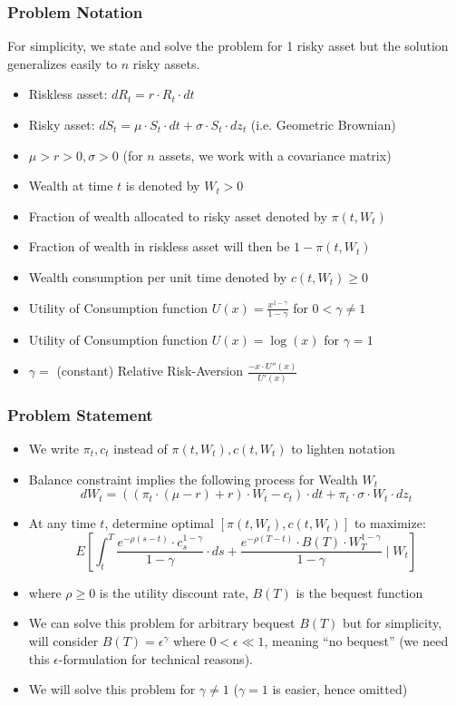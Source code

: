 \documentclass[handout]{beamer}
\begin{document}
\begin{frame}
\frametitle{Problem Notation}
For simplicity, we state and solve the problem for 1 risky asset but the solution generalizes easily to $n$ risky assets.
\pause
\begin{itemize}[<+->]
\item Riskless asset: $dR_t = r \cdot R_t \cdot dt$
\item Risky asset: $dS_t = \mu \cdot S_t \cdot dt + \sigma \cdot S_t \cdot dz_t$ (i.e. Geometric Brownian)
\item $\mu > r > 0, \sigma > 0$ (for $n$ assets, we work with a covariance matrix)
\item Wealth at time $t$ is denoted by $W_t > 0$
\item Fraction of wealth allocated to risky asset denoted by $\pi(t, W_t)$
\item Fraction of wealth in riskless asset will then be $1 - \pi(t, W_t)$
\item Wealth consumption per unit time denoted by $c(t, W_t) \geq 0$
\item Utility of Consumption function $U(x) = \frac {x^{1-\gamma}} {1 - \gamma}$ for $0 < \gamma \neq 1$
\item Utility of Consumption function $U(x) = \log(x)$ for $\gamma = 1$
\item $\gamma =$ (constant) Relative Risk-Aversion $\frac {-x \cdot U''(x)} {U'(x)}$
\end{itemize}
\end{frame}

\begin{frame}
\frametitle{Problem Statement}
\pause
\begin{itemize}[<+->]
\item We write $\pi_t, c_t$ instead of $\pi(t, W_t), c(t, W_t)$ to lighten notation
\item Balance constraint implies the following process for Wealth $W_t$
$$dW_t = ((\pi_t \cdot (\mu - r) + r) \cdot W_t - c_t) \cdot dt + \pi_t \cdot \sigma \cdot W_t \cdot dz_t$$
\item At any time $t$, determine optimal $[\pi(t,W_t), c(t, W_t)]$ to maximize:
$$E[\int_t^T \frac {e^{-\rho (s-t)} \cdot c_s^{1-\gamma}} {1-\gamma} \cdot ds + \frac {e^{-\rho (T-t)} \cdot B(T) \cdot W_T^{1-\gamma}} {1-\gamma} \mid W_t]$$
\item where $\rho \geq 0$ is the utility discount rate, $B(T)$ is the bequest function
\item We can solve this problem for arbitrary bequest $B(T)$ but for simplicity, will consider $B(T) = \epsilon^{\gamma}$
where $0 < \epsilon \ll 1$, meaning ``no bequest'' (we need this $\epsilon$-formulation for technical reasons).
\item We will solve this problem for $\gamma \neq 1$ ($\gamma = 1$ is easier, hence omitted)
\end{itemize}
\end{frame}
\end{document}
